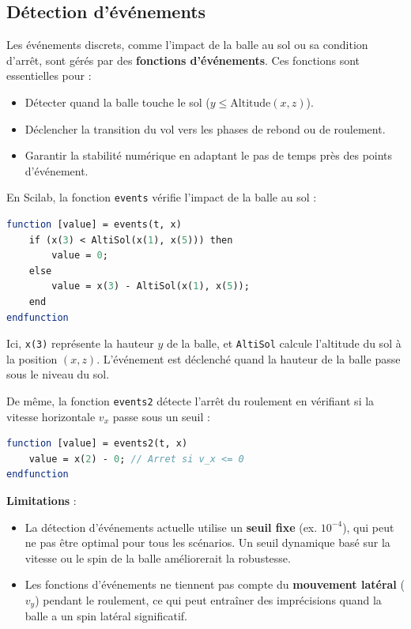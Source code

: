 \documentclass[10pt,a4paper]{report}
\begin{document}
\subsection{Détection d'événements}
\label{subsec:event_detection}

Les événements discrets, comme l'impact de la balle au sol ou sa condition d'arrêt, sont gérés par des \textbf{fonctions d'événements}. Ces fonctions sont essentielles pour :
\begin{itemize}
    \item Détecter quand la balle touche le sol (\( y \leq \text{Altitude}(x, z) \)).
    \item Déclencher la transition du vol vers les phases de rebond ou de roulement.
    \item Garantir la stabilité numérique en adaptant le pas de temps près des points d'événement.
\end{itemize}

En Scilab, la fonction \texttt{events} vérifie l'impact de la balle au sol :
\begin{lstlisting}[language=Scilab]
function [value] = events(t, x)
    if (x(3) < AltiSol(x(1), x(5))) then
        value = 0;
    else
        value = x(3) - AltiSol(x(1), x(5));
    end
endfunction
\end{lstlisting}
Ici, \texttt{x(3)} représente la hauteur \( y \) de la balle, et \texttt{AltiSol} calcule l'altitude du sol à la position \((x, z)\). L'événement est déclenché quand la hauteur de la balle passe sous le niveau du sol.

De même, la fonction \texttt{events2} détecte l'arrêt du roulement en vérifiant si la vitesse horizontale \( v_x \) passe sous un seuil :
\begin{lstlisting}[language=Scilab]
function [value] = events2(t, x)
    value = x(2) - 0; // Arret si v_x <= 0
endfunction
\end{lstlisting}

\textbf{Limitations} :
\begin{itemize}
    \item La détection d'événements actuelle utilise un \textbf{seuil fixe} (ex. \( 10^{-4} \)), qui peut ne pas être optimal pour tous les scénarios. Un seuil dynamique basé sur la vitesse ou le spin de la balle améliorerait la robustesse.
    \item Les fonctions d'événements ne tiennent pas compte du \textbf{mouvement latéral} (\( v_y \)) pendant le roulement, ce qui peut entraîner des imprécisions quand la balle a un spin latéral significatif.
\end{itemize}
\end{document}
